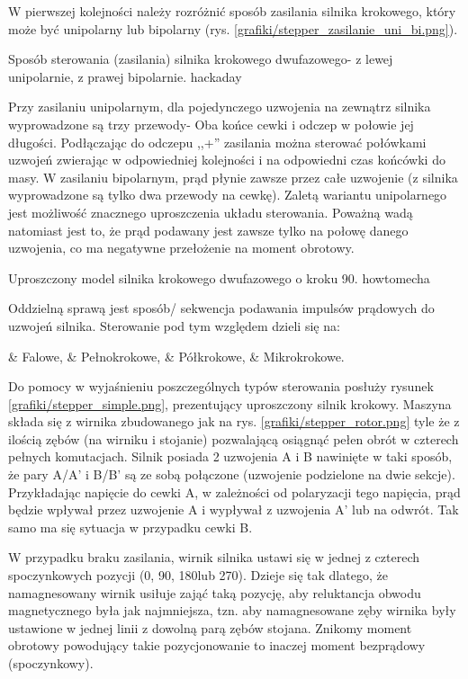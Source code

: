 W pierwszej kolejności należy rozróżnić sposób zasilania silnika krokowego, który może być unipolarny lub bipolarny (rys. \ref{grafiki/stepper_zasilanie_uni_bi.png}).

		{Sposób sterowania (zasilania) silnika krokowego dwufazowego- z lewej unipolarnie, z prawej bipolarnie.}
		{hackaday}

Przy zasilaniu unipolarnym, dla pojedynczego uzwojenia na zewnątrz silnika wyprowadzone są trzy przewody- Oba końce cewki i odczep w połowie jej długości. Podłączając do odczepu ,,+'' zasilania można sterować połówkami uzwojeń zwierając w odpowiedniej kolejności i na odpowiedni czas końcówki do masy. W zasilaniu bipolarnym, prąd płynie zawsze przez całe uzwojenie (z silnika wyprowadzone są tylko dwa przewody na cewkę). Zaletą wariantu unipolarnego jest możliwość znacznego uproszczenia układu sterowania. Poważną wadą natomiast jest to, że prąd podawany jest zawsze tylko na połowę danego uzwojenia, co ma negatywne przełożenie na moment obrotowy. 

		{Uproszczony model silnika krokowego dwufazowego o kroku 90\degree.}
		{howtomecha}

Oddzielną sprawą jest sposób/ sekwencja podawania impulsów prądowych do uzwojeń silnika. Sterowanie pod tym względem dzieli się na:

\begin{easylist}
	& Falowe, 
	& Pełnokrokowe, 
	& Półkrokowe,
	& Mikrokrokowe.
	\\
\end{easylist}

Do pomocy w wyjaśnieniu poszczególnych typów sterowania posłuży rysunek \ref{grafiki/stepper_simple.png}, prezentujący uproszczony silnik krokowy. Maszyna składa się z wirnika zbudowanego jak na rys. \ref{grafiki/stepper_rotor.png} tyle że z ilością zębów (na wirniku i stojanie) pozwalającą osiągnąć pełen obrót w czterech pełnych komutacjach. Silnik posiada 2 uzwojenia A i B nawinięte w taki sposób, że pary A/A' i B/B' są ze sobą połączone (uzwojenie podzielone na dwie sekcje). Przykładając napięcie do cewki A, w zależności od polaryzacji tego napięcia, prąd będzie wpływał przez uzwojenie A i wypływał z uzwojenia A' lub na odwrót. Tak samo ma się sytuacja w przypadku cewki B.


W przypadku braku zasilania, wirnik silnika ustawi się w jednej z czterech spoczynkowych pozycji (0\degree, 90\degree, 180\degree lub 270\degree). Dzieje się tak dlatego, że namagnesowany wirnik usiłuje zająć taką pozycję, aby reluktancja obwodu magnetycznego była jak najmniejsza, tzn. aby namagnesowane zęby wirnika były ustawione w jednej linii z dowolną parą zębów stojana. Znikomy moment obrotowy powodujący takie pozycjonowanie to inaczej moment bezprądowy (spoczynkowy). 

